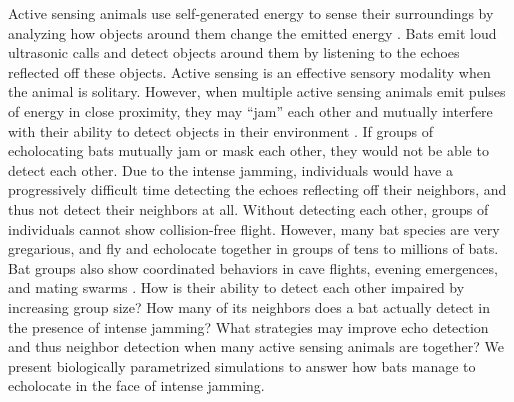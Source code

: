 \documentclass[
]{book}
\begin{document}
Active sensing animals use self-generated energy to sense their surroundings by analyzing how objects around them change the emitted energy \citep{nelson2006a}. Bats emit loud ultrasonic calls and detect objects around them by listening to the echoes \citep[\citet{griffin1958a}]{fenton2013a}reflected off these objects. Active sensing is an effective sensory modality when the animal is solitary. However, when multiple active sensing animals emit pulses of energy in close proximity, they may ``jam'' each other and mutually interfere with their ability to detect objects in their environment \citep[\citet{matsubara1978a}]{nelson2006a}. If groups of echolocating bats mutually jam or mask each other, they would not be able to detect each other. Due to the intense jamming, individuals would have a progressively difficult time detecting the echoes reflecting off their neighbors, and thus not detect their neighbors at all. Without detecting each other, groups of individuals cannot show collision-free flight. However, many bat species are very gregarious, and fly and echolocate together in groups of tens to millions of bats. Bat groups also show coordinated behaviors in cave flights, evening emergences, and mating swarms \citep[\citet{kunz1982a}]{ortega2016a}. How is their ability to detect each other impaired by increasing group size? How many of its neighbors does a bat actually detect in the presence of intense jamming? What strategies may improve echo detection and thus neighbor detection when many active sensing animals are together? We present biologically parametrized simulations to answer how bats manage to echolocate in the face of intense jamming.
\end{document}
